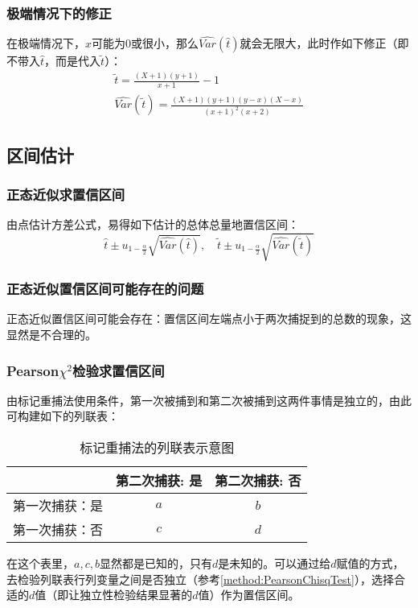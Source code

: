 \subsubsection{极端情况下的修正}
在极端情况下，$x$可能为$0$或很小，那么$\widehat{Var}(\hat{t})$就会无限大，此时作如下修正（即不带入$\hat{t}$，而是代入$\tilde{t}$）：
\begin{gather*}
	\tilde{t}=\frac{(X+1)(y+1)}{x+1}-1 \\
	\widehat{Var}(\tilde{t})=\frac{(X+1)(y+1)(y-x)(X-x)}{(x+1)^2(x+2)}
\end{gather*}

\subsection{区间估计}
\subsubsection{正态近似求置信区间}
由点估计方差公式，易得如下估计的总体总量地置信区间：
\begin{equation*}
	\hat{t}\pm u_{1-\frac{\alpha}{2}}\sqrt{\widehat{Var}(\hat{t})},\quad
	\tilde{t}\pm u_{1-\frac{\alpha}{2}}\sqrt{\widehat{Var}(\tilde{t})}
\end{equation*}
\subsubsection{正态近似置信区间可能存在的问题}
正态近似置信区间可能会存在：置信区间左端点小于两次捕捉到的总数的现象，这显然是不合理的。
\subsubsection{Pearson$\chi^2$检验求置信区间}
由标记重捕法使用条件，第一次被捕到和第二次被捕到这两件事情是独立的，由此可构建如下的列联表：
\begin{table}[h!]
	\centering
	\begin{tabular}{@{}lcc@{}}
		\toprule
		& 第二次捕获: 是 & 第二次捕获: 否 \\ 
		\midrule
		第一次捕获：是    & $a$           & $b$           \\
		第一次捕获：否    & $c$           & $d$           \\ 
		\bottomrule
	\end{tabular}
	\caption{标记重捕法的列联表示意图}
\end{table}
\par 在这个表里，$a,c,b$显然都是已知的，只有$d$是未知的。可以通过给$d$赋值的方式，去检验列联表行列变量之间是否独立（参考\cref{method:PearsonChisqTest}），选择合适的$d$值（即让独立性检验结果显著的$d$值）作为置信区间。
